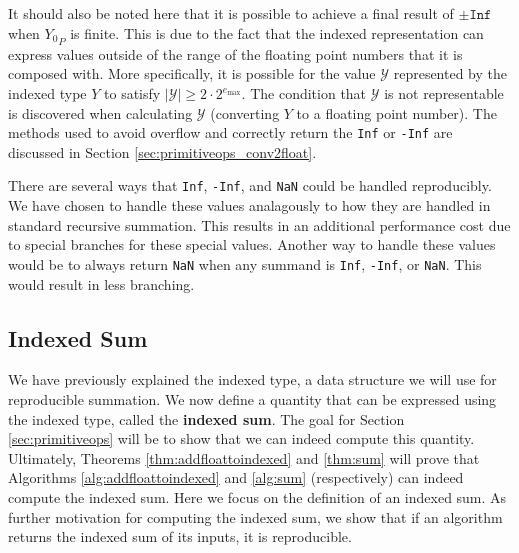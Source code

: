       It should also be noted here that it is possible to achieve a final result of
      $\pm \texttt{Inf}$ when ${Y_0}_P$ is finite. This is due to
      the fact that the indexed representation can express values outside of
      the range of the floating point numbers that it is composed with. More
      specifically, it is possible for the value $\mathcal{Y}$ represented by
      the indexed type $Y$ to satisfy $|\mathcal{Y}| \geq 2 \cdot
      2^{e_{\max}}$. The condition that $\mathcal{Y}$ is not representable is
      discovered when calculating $\mathcal{Y}$ (converting $Y$ to a floating
      point number). The methods used to avoid overflow and correctly return
      the \texttt{Inf} or \texttt{-Inf} are discussed in Section
      \ref{sec:primitiveops_conv2float}.

      There are several ways that \texttt{Inf}, \texttt{-Inf}, and \texttt{NaN} could be handled reproducibly. We have chosen to handle these values analagously to how they are handled in standard recursive summation. This results in an additional performance cost due to special branches for these special values. Another way to handle these values would be to always return \texttt{NaN} when any summand is \texttt{Inf}, \texttt{-Inf}, or \texttt{NaN}. This would result in less branching.

    \subsection{Indexed Sum}
      \label{sec:indexed_sum}
      We have previously explained the indexed type, a data structure we will use for reproducible summation. We now define a quantity that can be expressed using the indexed type, called the \textbf{indexed sum}. The goal for Section \ref{sec:primitiveops} will be to show that we can indeed compute this quantity. Ultimately, Theorems \ref{thm:addfloattoindexed} and \ref{thm:sum} will prove that Algorithms \ref{alg:addfloattoindexed} and \ref{alg:sum} (respectively) can indeed compute the indexed sum. Here we focus on the definition of an indexed sum. As further motivation for computing the indexed sum, we show that if an algorithm returns the indexed sum of its inputs, it is reproducible.

